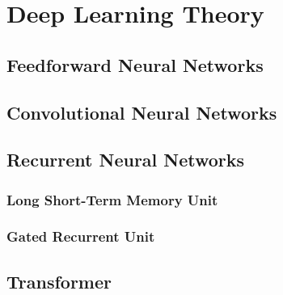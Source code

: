 \documentclass[./main.tex]{subfiles}
\begin{document}
\section{Deep Learning Theory}

\subsection{Feedforward Neural Networks}
\subsection{Convolutional Neural Networks}
\subsection{Recurrent Neural Networks}
\subsubsection{Long Short-Term Memory Unit}
\subsubsection{Gated Recurrent Unit}
\subsection{Transformer}
\end{document}
